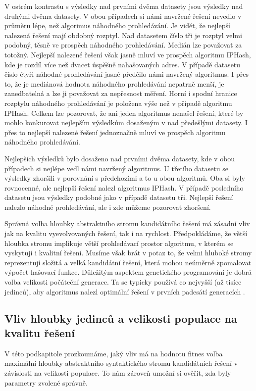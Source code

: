 V ostrém kontrastu s výsledky nad prvními dvěma datasety jsou výsledky nad druhými dvěma datasety. V obou případech
si námi navržené řešení nevedlo v průměru lépe, než algorimus náhodného prohledávání. Je vidět, že nejlepší
nalezená řešení mají obdobný rozptyl. Nad datasetem číslo tři je rozptyl velmi podobný, těsně ve prospěch 
náhodného prohledávání. Medián lze považovat za totožný. Nejlepší nalezené řešení však jasně mluví ve prospěch
algoritmu IPHash, kde je rozdíl více než dvacet úspěšně nahašovaných adres. V případě datasetu číslo čtyři náhodné
prohledávání jasně předčilo námi navržený algoritmus. I přes to, že je mediánová hodnota náhodného prohledávání
nepatrně menší, je zanedbatelná a lze ji považovat za nepřesnost měření. Horní i spodní hranice rozptylu náhodného
prohledávání je položena výše než v případě algoritmu IPHash. Celkem lze pozorovat, že ani jeden algoritmus 
nenašel řešení, které by mohlo konkurovat nejlepším výsledkům dosaženým v nad předešlými datasety. I přes to
nejlepší nalezené řešení jednoznačně mluví ve prospěch algoritmu náhodného prohledávání.

Nejlepších výsledků bylo dosaženo nad prvními dvěma datasety, kde v obou případech si nejlépe vedl námi navržený
algoritmus. U třetího datasetu se výsledky zhoršili v porovnání s předchozími a to u obou algoritmů. Oba si byly 
rovnocenné, ale nejlepší řešení nalezl algoritmus IPHash. V případě posledního datasetu jsou výsledky podobné jako
v případě datasetu tři. Nejlepší řešení nalezlo náhodné prohledávání, ale i zde můžeme pozorovat zhoršení. 

Správná volba hloubky abstraktního stromu kandidátního řešení má zásadní vliv jak na kvalitu vyevolvovaných řešení,
tak i na rychlost. Předpokládáme, že větší hloubka stromu implikuje větší prohledávací prostor algoritmu, v kterém
se vyskytují i kvalitní řešení. Musíme však brát v potaz to, že velmi hluboké stromy reprezentují složitá a velká kandidátní
řešení, která mohou neúměrně zpomalovat výpočet hašovací funkce. Důležitým aspektem genetického programování je 
dobrá volba velikosti počáteční generace. Ta se typicky používá co nejvyšší (až tisíce jedinců), aby algoritmus nalezl
optimální řešení v prvních padesátí generacích \cite{GPTutorial}.


\subsection{Vliv hloubky jedinců a velikosti populace na kvalitu řešení}
V této podkapitole prozkoumáme, jaký vliv má na hodnotu fitnes volba maximální hloubky abstraktního syntaktického
stromu kandidátních řešení v závislosti na velikosti populace. To nám zároveň umožní si ověřit, zda byly parametry zvolené
správně.

